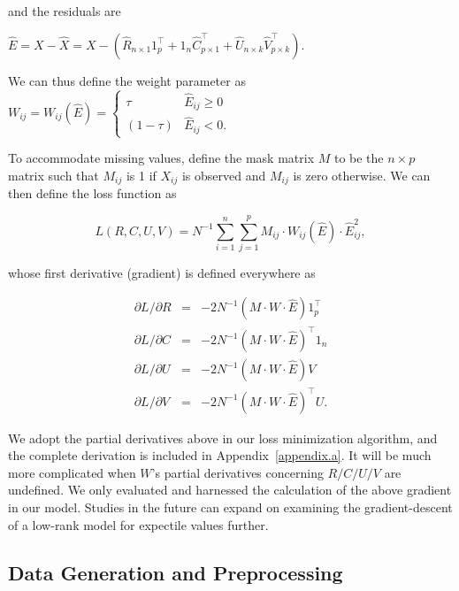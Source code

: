 \documentclass{article}
\begin{document}
\noindent and the residuals are

\begin{center}
    $\widehat{E} = X - \widehat{X} = X - (\widehat{R}_{n \times 1}1^{\top}_{p} + 1_{n}\widehat{C}_{p \times 1}^{\top} + \widehat{U}_{n \times k}\widehat{V}^{\top}_{p \times k})$.
\end{center}

\noindent We can thus define the weight parameter as $W_{ij} = W_{ij}(\widehat{E}) = \begin{cases}
    \tau & \widehat{E}_{ij} \geq 0\\
    (1 - \tau) & \widehat{E}_{ij} < 0.
\end{cases}$

\noindent To accommodate missing values, define the mask matrix $M$ to be the $n\times p$ matrix such that $M_{ij}$ is 1 if $X_{ij}$ is observed and $M_{ij}$ is zero otherwise. We can then define the loss function as

\begin{equation}
    L(R, C, U, V) = N^{-1}\sum_{i = 1}^{n}\sum_{j = 1}^{p} M_{ij} \cdot W_{ij}(\hat{E}) \cdot \widehat{E}_{ij}^2, \label{loss}
\end{equation}

\noindent whose first derivative (gradient) is defined everywhere as

\begin{eqnarray}
    \partial L / \partial R &=& -2N^{-1}(M \cdot W \cdot \widehat{E})1_{p}^\top\nonumber\\
    \partial L / \partial C &=& -2N^{-1}(M \cdot W \cdot \widehat{E})^\top1_{n}\nonumber\\
    \partial L / \partial U &=& -2N^{-1}(M \cdot W \cdot \widehat{E})V\nonumber\\
    \partial L / \partial V &=& -2N^{-1}(M \cdot W \cdot \widehat{E})^\top U.
\end{eqnarray}

We adopt the partial derivatives above in our loss minimization algorithm, and the complete derivation is included in Appendix~\ref{appendix.a}. It will be much more complicated when $W$'s partial derivatives concerning $R/C/U/V$ are undefined. We only evaluated and harnessed the calculation of the above gradient in our model. Studies in the future can expand on examining the gradient-descent of a low-rank model for expectile values further. 

\subsection{Data Generation and Preprocessing}
\end{document}
